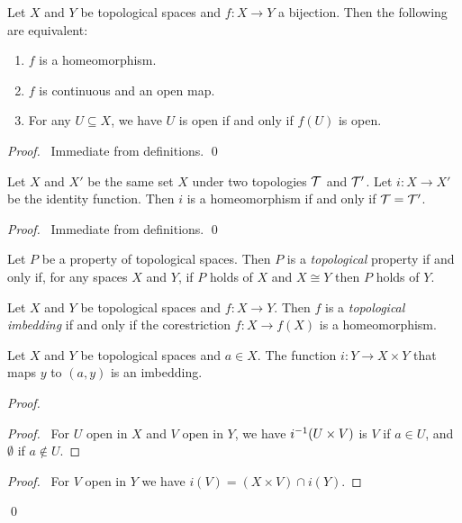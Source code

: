 \begin{lemma}
    Let $X$ and $Y$ be topological spaces and $f : X \rightarrow Y$ a bijection. Then the following are
    equivalent:
    \begin{enumerate}
        \item $f$ is a homeomorphism.
        \item $f$ is continuous and an open map.
        \item For any $U \subseteq X$, we have $U$ is open if and only if $f(U)$ is open.
    \end{enumerate}
\end{lemma}

\begin{proof}
    \pf\ Immediate from definitions. \qed
\end{proof}

\begin{proposition}
    Let $X$ and $X'$ be the same set $X$ under two topologies $\mathcal{T}$ and $\mathcal{T}'$. Let $i : X \rightarrow X'$
    be the identity function. Then $i$ is a homeomorphism if and only if $\mathcal{T} = \mathcal{T}'$.
\end{proposition}

\begin{proof}
    \pf\ Immediate from definitions. \qed
\end{proof}

\begin{definition}
    Let $P$ be a property of topological spaces. Then $P$ is a \emph{topological} property if and only if,
    for any spaces $X$ and $Y$, if $P$ holds of $X$ and $X \cong Y$ then $P$ holds of $Y$.
\end{definition}

\begin{definition}
    Let $X$ and $Y$ be topological spaces and $f : X \rightarrow Y$. Then $f$ is a \emph{topological
    imbedding} if and only if the corestriction $f : X \rightarrow f(X)$ is a homeomorphism.
\end{definition}

\begin{proposition}
    \label{proposition:imbedding_product}
    Let $X$ and $Y$ be topological spaces and $a \in X$. The function $i : Y \rightarrow X \times Y$ that maps $y$ to $(a,y)$ is an imbedding.
\end{proposition}

\begin{proof}
    \pf
    \begin{proof}
        \pf\ For $U$ open in $X$ and $V$ open in $Y$, we have ${i}^{-1}(U \times V)$ is $V$ if $a \in U$, and $\emptyset$ if $a \notin U$.
    \end{proof}
    \begin{proof}
        \pf\ For $V$ open in $Y$ we have $i(V) = (X \times V) \cap i(Y)$.
    \end{proof}
    \qed
\end{proof}

